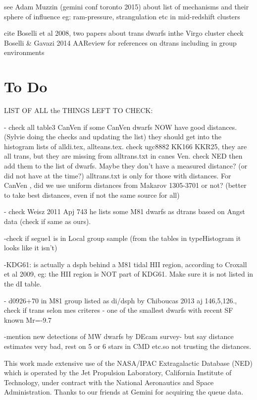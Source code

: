 \documentclass[12pt,preprint]{emulateapj}
\begin{document}
see Adam Muzzin (gemini conf toronto 2015) about list of mechanisms and their sphere of influence eg: ram-pressure, strangulation etc in mid-redshift clusters

cite Boselli et al 2008, two papers about trans dwarfs inthe Virgo cluster
check Boselli & Gavazi 2014 AAReview for references on dtrans including in group environments



\section{To Do}

LIST OF ALL the THINGS LEFT TO CHECK:

- check all table3 CanVen if some CanVen dwarfs NOW have good distances. (Sylvie doing the checks and updating the list) they should get into 
the histogram lists of alldi.tex, allteans.tex. check ugc8882 KK166 KKR25, they are all trans, but they are missing from alltrans.txt in canes Ven. 
check NED then add them to the list of dwarfs. Maybe they don't have a measured distance? (or did not have at the time?) alltrans.txt is only for 
those with distances. For CanVen , did we use uniform distances from Makarov 1305-3701 or not? (better to take best distances, even if not the 
same source for all)

- check Weisz 2011 Apj 743 he lists some M81 dwarfs as dtrans based on Angst data (check if same as ours).

-check if segue1 is in Local group sample (from the tables in typeHistogram it looks like it isn't)

-KDG61: is actually a dsph behind a M81 tidal HII region, according to Croxall et al 2009, eg: the HII region is NOT part of KDG61. Make sure it is not listed in the dI table.


- d0926+70 in M81 group listed as di/dsph by Chiboucas 2013 aj 146,5,126., check if trans selon mes criteres - one of the smallest dwarfs with recent SF known Mr=-9.7

-mention new detections of MW dwarfs by DEcam survey- but say distance estimates very bad, rest on 5 or 6 stars in CMD etc.so not trusting the distances.

\acknowledgments

This work made extensive use of the NASA/IPAC Extragalactic Database (NED) which is operated by the Jet Propulsion Laboratory, California Institute of Technology, 
under contract with the National Aeronautics and Space Administration. Thanks to our friends at Gemini for acquiring the queue data.
\end{document}
